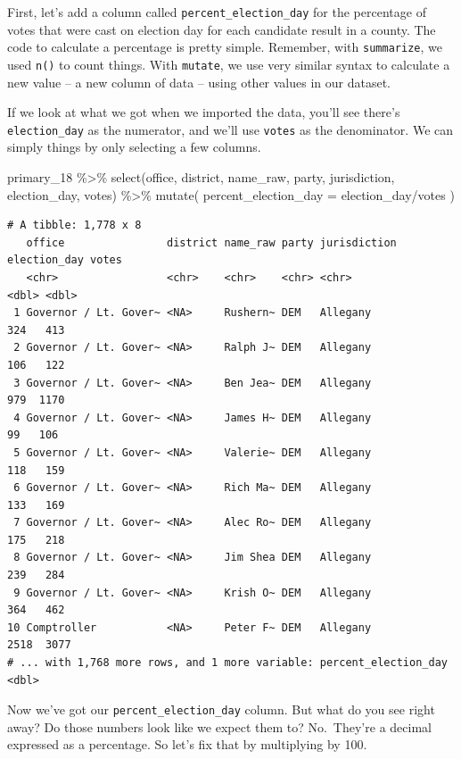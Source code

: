 \documentclass[
  letterpaper,
  DIV=11,
  numbers=noendperiod]{scrreprt}
\newenvironment{Shaded}{\begin{snugshade}}{\end{snugshade}}
\newcommand{\AttributeTok}[1]{\textcolor[rgb]{0.40,0.45,0.13}{#1}}
\newcommand{\FunctionTok}[1]{\textcolor[rgb]{0.28,0.35,0.67}{#1}}
\newcommand{\NormalTok}[1]{\textcolor[rgb]{0.00,0.23,0.31}{#1}}
\newcommand{\SpecialCharTok}[1]{\textcolor[rgb]{0.37,0.37,0.37}{#1}}
\begin{document}
First, let's add a column called \texttt{percent\_election\_day} for the
percentage of votes that were cast on election day for each candidate
result in a county. The code to calculate a percentage is pretty simple.
Remember, with \texttt{summarize}, we used \texttt{n()} to count things.
With \texttt{mutate}, we use very similar syntax to calculate a new
value -- a new column of data -- using other values in our dataset.

If we look at what we got when we imported the data, you'll see there's
\texttt{election\_day} as the numerator, and we'll use \texttt{votes} as
the denominator. We can simply things by only selecting a few columns.

\begin{Shaded}
\begin{Highlighting}[]
\NormalTok{primary\_18 }\SpecialCharTok{\%\textgreater{}\%}
  \FunctionTok{select}\NormalTok{(office, district, name\_raw, party, jurisdiction, election\_day, votes) }\SpecialCharTok{\%\textgreater{}\%} 
  \FunctionTok{mutate}\NormalTok{(}
  \AttributeTok{percent\_election\_day =}\NormalTok{ election\_day}\SpecialCharTok{/}\NormalTok{votes}
\NormalTok{)}
\end{Highlighting}
\end{Shaded}

\begin{verbatim}
# A tibble: 1,778 x 8
   office                district name_raw party jurisdiction election_day votes
   <chr>                 <chr>    <chr>    <chr> <chr>               <dbl> <dbl>
 1 Governor / Lt. Gover~ <NA>     Rushern~ DEM   Allegany              324   413
 2 Governor / Lt. Gover~ <NA>     Ralph J~ DEM   Allegany              106   122
 3 Governor / Lt. Gover~ <NA>     Ben Jea~ DEM   Allegany              979  1170
 4 Governor / Lt. Gover~ <NA>     James H~ DEM   Allegany               99   106
 5 Governor / Lt. Gover~ <NA>     Valerie~ DEM   Allegany              118   159
 6 Governor / Lt. Gover~ <NA>     Rich Ma~ DEM   Allegany              133   169
 7 Governor / Lt. Gover~ <NA>     Alec Ro~ DEM   Allegany              175   218
 8 Governor / Lt. Gover~ <NA>     Jim Shea DEM   Allegany              239   284
 9 Governor / Lt. Gover~ <NA>     Krish O~ DEM   Allegany              364   462
10 Comptroller           <NA>     Peter F~ DEM   Allegany             2518  3077
# ... with 1,768 more rows, and 1 more variable: percent_election_day <dbl>
\end{verbatim}

Now we've got our \texttt{percent\_election\_day} column. But what do
you see right away? Do those numbers look like we expect them to?
No.~They're a decimal expressed as a percentage. So let's fix that by
multiplying by 100.
\end{document}
